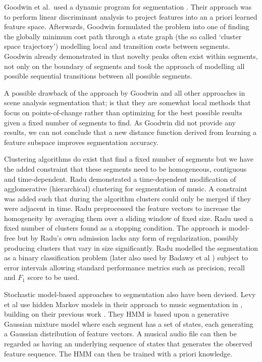 \documentclass[twocolumn]{article}
\begin{document}
	Goodwin et al.\ used a dynamic program for segmentation \citep{goodwin2004dynamic}. Their approach was to perform linear discriminant analysis to project features into an a priori learned feature space. Afterwards, Goodwin formulated the problem into one of finding the globally minimum cost path through a state graph (the so called `cluster space trajectory') modelling local and transition costs between segments. Goodwin already demonstrated in \citep{goodwin2003audio} that novelty peaks often exist within segments, not only on the boundary of segments and took the approach of modelling all possible sequential transitions between all possible segments.
	
	A possible drawback of the approach by Goodwin and all other approaches in scene analysis segmentation that; is that they are somewhat local methods that focus on points-of-change rather than optimizing for the best possible results given a fixed number of segments to find. As Goodwin did not provide any results, we can not conclude that a new distance function derived from learning a feature subspace improves segmentation accuracy. 
	
	Clustering algorithms do exist that find a fixed number of segments but we have the added constraint that these segments need to be homogeneous, contiguous and time-dependent. Radu \citep{radu} demonstrated a time-dependent modification of agglomerative (hierarchical) clustering for segmentation of music. A constraint was added such that during the algorithm clusters could only be merged if they were adjacent in time. Radu preprocessed the feature vectors to increase the homogeneity by averaging them over a sliding window of fixed size. Radu used a fixed number of clusters found as a stopping condition. The approach is model-free but by Radu's own admission lacks any form of regularization, possibly producing clusters that vary in size significantly. Radu modelled the segmentation as a binary classification problem (later also used by Badawy et al \citep{elaudio}) subject to error intervals allowing standard performance metrics such as precision, recall and $F_1$ score to be used. 
	
	Stochastic model-based approaches to segmentation also have been devised. Levy et al use hidden Markov models in their approach to music segmentation in \citep{levy2008structural}, building on their previous work \citep{levy2006new, levy2006extraction}. They HMM is based upon a generative Gaussian mixture model where each segment has a set of states, each generating a Gaussian distribution of feature vectors. A musical audio file can then be regarded as having an underlying sequence of states that generates the observed feature sequence. The HMM can then be trained with a priori knowledge. 
	
\end{document}
